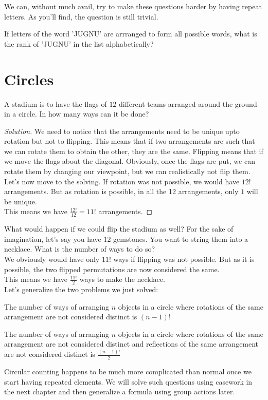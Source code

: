 We can, without much avail, try to make these questions harder by having repeat letters. As you'll find, the question is still trivial.\\
\begin{example}
    If letters of the word 'JUGNU' are arrranged to form all possible words, what is the rank of 'JUGNU' in the list alphabetically?
\end{example}
\section{Circles}
\begin{example}
A stadium is to have the flags of $12$ different teams arranged around the ground in a circle. In how many ways can it be done?  
\end{example}
\begin{proof}
    [Solution]
    We need to notice that the arrangements need to be unique upto rotation but not to flipping. This means that if two arrangements are such that we can rotate them to obtain the other, they are the same. Flipping means that if we move the flags about the diagonal. Obviously, once the flags are put, we can rotate them by changing our viewpoint, but we can realistically not flip them.\\
    Let's now move to the solving. If rotation was not possible, we would have $12!$ arrangements. But as rotation is possible, in all the 12 arrangements, only $1$ will be unique.\\
    This means we have $\frac{12!}{12}=11!$ arrangements.
\end{proof}
What would happen if we could flip the stadium as well? For the sake of imagination, let's say you have $12$ gemstones. You want to string them into a necklace. What is the number of ways to do so?\\
We obviously would have only $11!$ ways if flipping was not possible. But as it is possible, the two flipped permutations are now considered the same.\\
This means we have $\frac{11!}{2}$ ways to make the necklace.\\
Let's generalize the two problems we just solved:
\begin{theorem}
The number of ways of arranging $n$ objects in a circle where rotations of the same arrangement are not considered distinct is $(n - 1)!$ \\
\end{theorem}
\begin{theorem}
The number of ways of arranging $n$ objects in a circle where rotations of the same arrangement are not considered distinct and reflections of the same arrangement are not considered distinct is $\frac{(n-1)!}{2}$
\end{theorem}
Circular counting happens to be much more complicated than normal once we start having repeated elements. We will solve such questions using casework in the next chapter and then generalize a formula using group actions later.\\
